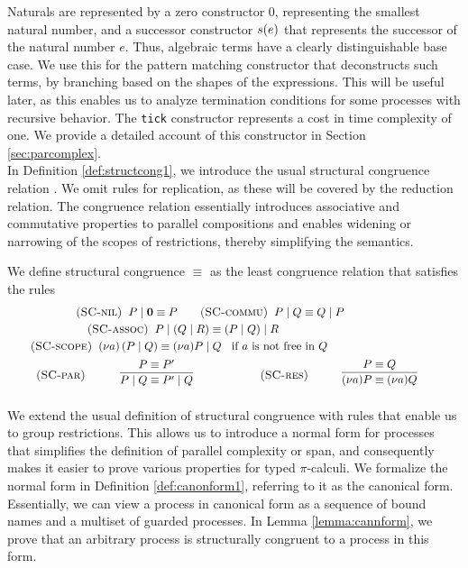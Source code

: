 Naturals are represented by a zero constructor $0$, representing the smallest natural number, and a successor constructor $s(e)$ that represents the successor of the natural number $e$. Thus, algebraic terms have a clearly distinguishable base case. We use this for the pattern matching constructor that deconstructs such terms, by branching based on the shapes of the expressions. This will be useful later, as this enables us to analyze termination conditions for some processes with recursive behavior. The \texttt{tick} constructor represents a cost in time complexity of one. We provide a detailed account of this constructor in Section \ref{sec:parcomplex}.\\

In Definition \ref{def:structcong1}, we introduce the usual structural congruence relation \cite{Milner1993}. We omit rules for replication, as these will be covered by the reduction relation. The congruence relation essentially introduces associative and commutative properties to parallel compositions and enables widening or narrowing of the scopes of restrictions, thereby simplifying the semantics.
%
\begin{defi}
We define structural congruence $\equiv$ as the least congruence relation that satisfies the rules
%
\begin{align*}
    &\kern6em\runa{SC-nil}\;\;\parcomp{P}{\nil} \equiv P\kern2em \runa{SC-commu}\;\; \parcomp{P}{Q} \equiv \parcomp{Q}{P}\\ &\kern7em\runa{SC-assoc}\;\; \parcomp{P}{\left(\parcomp{Q}{R}\right)} \equiv \parcomp{\left(\parcomp{P}{Q}\right)}{R}\\
    &\kern2em\runa{SC-scope}\;\;\newvar{a}{\left(\parcomp{P}{Q}\right)} \equiv \parcomp{\newvar{a}{P}}{Q}\;\; \text{ if } a \text{ is not free in } Q\\
    &\kern2.5em\runa{SC-par}\;\;\infrule{P \equiv P'}{\parcomp{P}{Q} \equiv \parcomp{P'}{Q}} \kern2em
    \runa{SC-res}\;\;\infrule{P \equiv Q}{\newvar{a}{P} \equiv \newvar{a}{Q}}
\end{align*}
\label{def:structcong1}
\end{defi}
%
We extend the usual definition of structural congruence with rules that enable us to group restrictions. This allows us to introduce a normal form for processes that simplifies the definition of parallel complexity or span, and consequently makes it easier to prove various properties for typed $\pi$-calculi. We formalize the normal form in Definition \ref{def:canonform1}, referring to it as the canonical form. Essentially, we can view a process in canonical form as a sequence of bound names and a multiset of guarded processes. In Lemma \ref{lemma:cannform}, we prove that an arbitrary process is structurally congruent to a process in this form.
